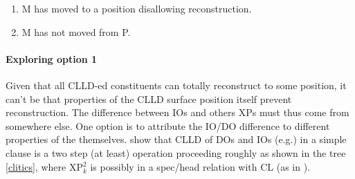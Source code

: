 \documentclass[output=paper]{langsci/langscibook}
\begin{document}
\begin{enumerate}
\item M has moved to a position disallowing reconstruction.
\item M has not moved from P.
\end{enumerate}

\paragraph*{Exploring option 1} Given  that all \gls{CLLD}-ed constituents can
totally reconstruct to some position, it can't be that properties of the
\gls{CLLD} surface position itself prevent
reconstruction. The difference between \glspl{IO} and others XPs must thus come
from somewhere else. One option is to attribute the IO/DO difference to
different properties of the  themselves.  \cite{Angelopoulo2017} show
that \gls{CLLD} of \glspl{DO} and \glspl{IO} (e.g.)
in a simple clause is a two step (at least) operation proceeding roughly as
shown in the tree \eqref{clitics}, where XP$_k^2$ is possibly in a spec/head
relation with CL (as in \citealt{Sportiche1996}).
\end{document}
